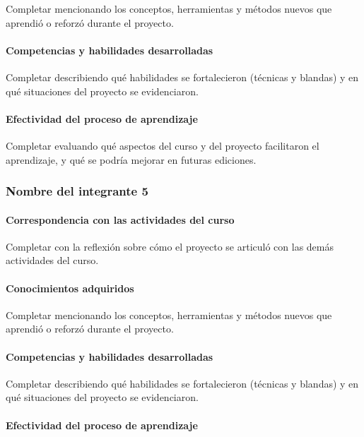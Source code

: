 \documentclass[11pt,a4paper]{article}
\begin{document}
Completar mencionando los conceptos, herramientas y métodos nuevos que
aprendió o reforzó durante el proyecto.

\paragraph{Competencias y habilidades desarrolladas}

Completar describiendo qué habilidades se fortalecieron (técnicas y blandas)
y en qué situaciones del proyecto se evidenciaron.

\paragraph{Efectividad del proceso de aprendizaje}

Completar evaluando qué aspectos del curso y del proyecto facilitaron el
aprendizaje, y qué se podría mejorar en futuras ediciones.

\subsubsection*{Nombre del integrante 5}


\paragraph{Correspondencia con las actividades del curso}

Completar con la reflexión sobre cómo el proyecto se articuló con las demás
actividades del curso.

\paragraph{Conocimientos adquiridos}

Completar mencionando los conceptos, herramientas y métodos nuevos que
aprendió o reforzó durante el proyecto.

\paragraph{Competencias y habilidades desarrolladas}

Completar describiendo qué habilidades se fortalecieron (técnicas y blandas)
y en qué situaciones del proyecto se evidenciaron.

\paragraph{Efectividad del proceso de aprendizaje}
\end{document}
